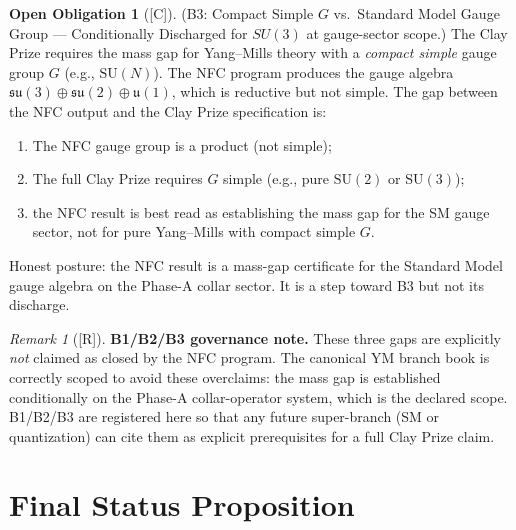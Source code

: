 \documentclass[12pt,oneside]{amsbook}
\theoremstyle{plain}
\theoremstyle{definition}
\newtheorem{obligation}[theorem]{Open Obligation}
\theoremstyle{remark}
\newtheorem{remark}[theorem]{Remark}
\newcommand{\status}[1]{\textup{[#1]}}
\begin{document}
\begin{obligation}[\status{C}]\label{ob:YM-B3}
\textup{(B3: Compact Simple $G$ vs.\ Standard Model Gauge Group --- Conditionally Discharged for $SU(3)$ at gauge-sector scope.)}
The Clay Prize requires the mass gap for Yang--Mills theory
with a \emph{compact simple} gauge group $G$ (e.g., $\mathrm{SU}(N)$).
The NFC program produces the gauge algebra
$\mathfrak{su}(3)\oplus\mathfrak{su}(2)\oplus\mathfrak{u}(1)$,
which is reductive but not simple. The gap between the NFC
output and the Clay Prize specification is:
\begin{enumerate}[label=\textup{(\roman*)}]
 \item The NFC gauge group is a product (not simple);
 \item The full Clay Prize requires $G$ simple (e.g., pure
 $\mathrm{SU}(2)$ or $\mathrm{SU}(3)$);
 \item the NFC result is best read as establishing the mass
 gap for the SM gauge sector, not for pure Yang--Mills
 with compact simple $G$.
\end{enumerate}
Honest posture: the NFC result is a mass-gap certificate for
the Standard Model gauge algebra on the Phase-A collar sector.
It is a step toward B3 but not its discharge.
\end{obligation}

\begin{remark}[\status{R}]
\textbf{B1/B2/B3 governance note.}
These three gaps are explicitly \emph{not} claimed as closed by
the NFC program. The canonical YM branch book is correctly
scoped to avoid these overclaims: the mass gap is established
conditionally on the Phase-A collar-operator system, which is
the declared scope. B1/B2/B3 are registered here so that any
future super-branch (SM or quantization) can cite them as
explicit prerequisites for a full Clay Prize claim.
\end{remark}

\section{Final Status Proposition}
\label{sec:status}
\end{document}

